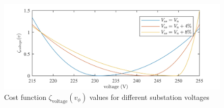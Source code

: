 \begin{figure}\centering
	\includegraphics{_chapter1/fig/voltage-deviation}
	\caption{Cost function $\zeta_\text{voltage}(v_\phi)$ values for different substation voltages}	
	\label{ch1:fig:voltage-deviation}
\end{figure}